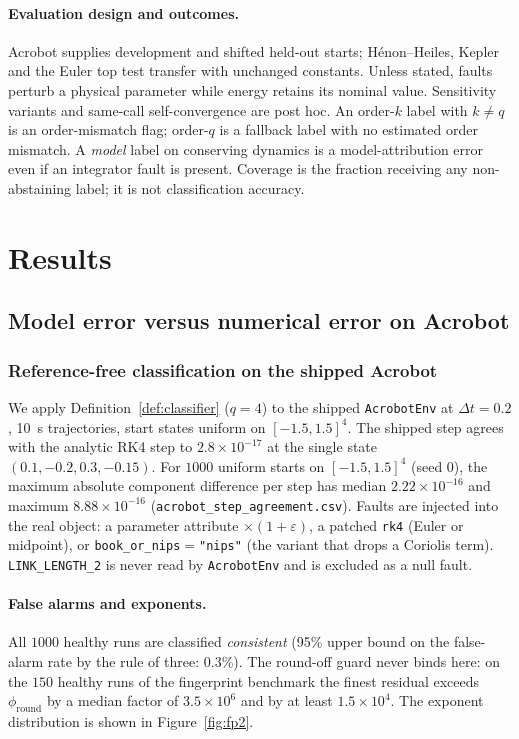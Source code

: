 \documentclass[10pt]{article}
\theoremstyle{definition}
\begin{document}
\paragraph{Evaluation design and outcomes.}
Acrobot supplies development and shifted held-out starts; H\'enon--Heiles,
Kepler and the Euler top test transfer with unchanged constants. Unless stated,
faults perturb a physical parameter while energy retains its nominal value.
Sensitivity variants
and same-call self-convergence are post hoc.
An order-$k$ label with $k\ne q$ is an order-mismatch flag; order-$q$ is a
fallback label with no estimated order mismatch. A \emph{model} label on
conserving dynamics is a model-attribution error even if an integrator fault
is present. Coverage is the fraction receiving any non-abstaining label;
it is not classification accuracy.

\section{Results}\label{sec:results}

\subsection{Model error versus numerical error on Acrobot}\label{sec:validation}

\subsubsection{Reference-free classification on the shipped Acrobot}\label{sec:exp:acrobot}

We apply Definition~\ref{def:classifier} ($q=4$) to the shipped
\texttt{AcrobotEnv} at $\Delta t=0.2$, 10~s trajectories, start states
uniform on $[-1.5,1.5]^4$. The shipped step agrees with the analytic RK4
step to $2.8\times10^{-17}$ at the single state $(0.1,-0.2,0.3,-0.15)$.
For $1000$ uniform starts on $[-1.5,1.5]^4$ (seed 0), the maximum absolute
component difference per step has median $2.22\times10^{-16}$ and maximum
$8.88\times10^{-16}$ (\texttt{acrobot\_step\_agreement.csv}). Faults are injected into the real object: a
parameter attribute $\times(1+\varepsilon)$, a patched \texttt{rk4}
(Euler or midpoint), or \texttt{book\_or\_nips}$=$\texttt{"nips"} (the
variant that drops a Coriolis term). \texttt{LINK\_LENGTH\_2} is never read by
\texttt{AcrobotEnv} and is excluded as a null fault.

\paragraph{False alarms and exponents.} All $1000$ healthy runs are
classified \emph{consistent} (95\% upper bound on the false-alarm rate by the
rule of three: $0.3\%$). The round-off guard never binds here: on the
$150$ healthy runs of the fingerprint benchmark the finest residual exceeds $\phi_{\mathrm{round}}$ by a median factor of
$3.5\times10^{6}$ and by at least $1.5\times10^{4}$. The exponent distribution is shown in Figure~\ref{fig:fp2}.
\end{document}
